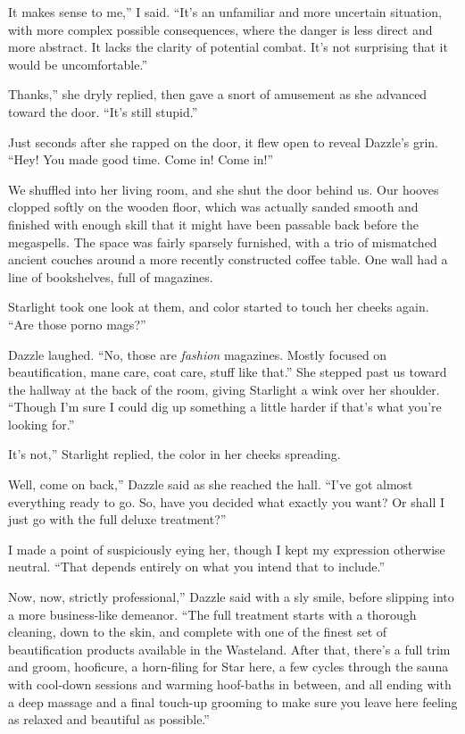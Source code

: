 \leavevmode{}It makes sense to me,” I said. “It’s an unfamiliar and more uncertain situation, with more complex possible consequences, where the danger is less direct and more abstract. It lacks the clarity of potential combat. It’s not surprising that it would be uncomfortable.”

\leavevmode{}Thanks,” she dryly replied, then gave a snort of amusement as she advanced toward the door. “It’s still stupid.”

Just seconds after she rapped on the door, it flew open to reveal Dazzle’s grin. “Hey! You made good time. Come in! Come in!”

We shuffled into her living room, and she shut the door behind us. Our hooves clopped softly on the wooden floor, which was actually sanded smooth and finished with enough skill that it might have been passable back before the megaspells. The space was fairly sparsely furnished, with a trio of mismatched ancient couches around a more recently constructed coffee table. One wall had a line of bookshelves, full of magazines.

Starlight took one look at them, and color started to touch her cheeks again. “Are those porno mags?”

Dazzle laughed. “No, those are \textit{fashion} magazines. Mostly focused on beautification, mane care, coat care, stuff like that.” She stepped past us toward the hallway at the back of the room, giving Starlight a wink over her shoulder. “Though I’m sure I could dig up something a little harder if that’s what you’re looking for.”

\leavevmode{}It’s not,” Starlight replied, the color in her cheeks spreading.

\leavevmode{}Well, come on back,” Dazzle said as she reached the hall. “I’ve got almost everything ready to go. So, have you decided what exactly you want? Or shall I just go with the full deluxe treatment?”

I made a point of suspiciously eying her, though I kept my expression otherwise neutral. “That depends entirely on what you intend that to include.”

\leavevmode{}Now, now, strictly professional,” Dazzle said with a sly smile, before slipping into a more business-like demeanor. “The full treatment starts with a thorough cleaning, down to the skin, and complete with one of the finest set of beautification products available in the Wasteland. After that, there’s a full trim and groom, hooficure, a horn-filing for Star here, a few cycles through the sauna with cool-down sessions and warming hoof-baths in between, and all ending with a deep massage and a final touch-up grooming to make sure you leave here feeling as relaxed and beautiful as possible.”

